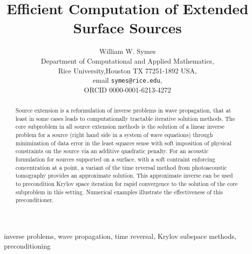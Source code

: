 \documentclass[georeport,12pt]{geophysics}
\begin{document}
\title{Efficient Computation of Extended Surface Sources}
\author{William W. Symes\\
  Department of Computational and Applied Mathematics,\\
  Rice University,Houston TX 77251-1892 USA,\\
  email {\tt symes@rice.edu},\\
ORCID 0000-0001-6213-4272}



\maketitle
\begin{abstract}
Source extension is a reformulation of inverse problems in wave
propagation, that at least in some cases leads to computationally
tractable iterative solution methods. The core subproblem in all
source extension methods is the solution of a linear inverse problem
for a source (right hand side in a system of wave equations) through
minimization of data error in the least squares sense with soft
imposition of physical constraints on the source via an additive
quadratic penalty. For an acoustic formulation for sources supported
on a surface, with a soft contraint enforcing concentration at a
point, a variant of the time reversal method from photoacoustic
tomography provides an approximate solution. This approximate inverse
can be used to precondition Krylov space iteration for rapid
convergence to the solution of the core subproblem in this
setting. Numerical examples illustrate the effectiveness of this preconditioner.
\end{abstract}

 inverse problems, wave propagation, time
reversal, Krylov subspace methods, preconditioning

\end{document}
